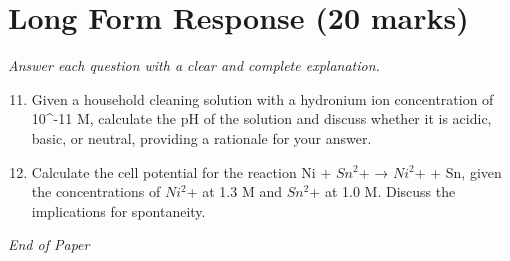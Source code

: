 \documentclass[12pt]{article}
\begin{document}
\section*{Long Form Response (20 marks)}
\textit{Answer each question with a clear and complete explanation.}
\begin{enumerate}[label=\arabic*.]
\setcounter{enumi}{10}
\item Given a household cleaning solution with a hydronium ion concentration of 10^-11 M, calculate the pH of the solution and discuss whether it is acidic, basic, or neutral, providing a rationale for your answer.
\item Calculate the cell potential for the reaction Ni + $Sn^2$+ → $Ni^2$+ + Sn, given the concentrations of $Ni^2$+ at 1.3 M and $Sn^2$+ at 1.0 M. Discuss the implications for spontaneity.
\end{enumerate}

\vfill
\noindent\textit{End of Paper}
\end{document}
